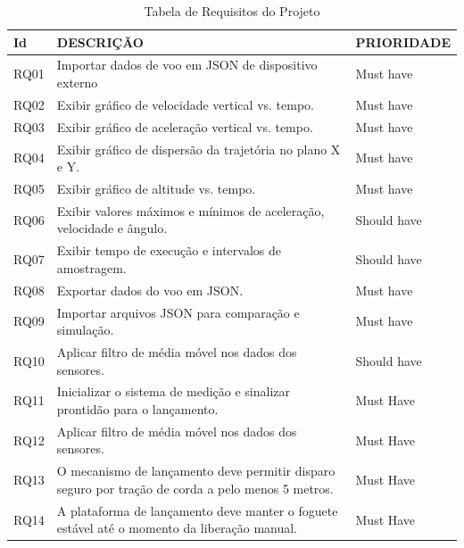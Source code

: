 \begin{samepage}
\begin{table}[H]
\centering
\scriptsize
\setlength{\tabcolsep}{4pt}
\caption{Tabela de Requisitos do Projeto}
\begin{tabular}{|l|p{8cm}|l|}
\hline
Id & DESCRIÇÃO & PRIORIDADE \\
\hline
RQ01 & Importar dados de voo em JSON de dispositivo externo & Must have \\
\hline
RQ02 & Exibir gráfico de velocidade vertical vs. tempo. & Must have \\
\hline
RQ03 & Exibir gráfico de aceleração vertical vs. tempo. & Must have \\
\hline
RQ04 & Exibir gráfico de dispersão da trajetória no plano X e Y. & Must have \\
\hline
RQ05 & Exibir gráfico de altitude vs. tempo. & Must have \\
\hline
RQ06 & Exibir valores máximos e mínimos de aceleração, velocidade e ângulo. & Should have \\
\hline
RQ07 & Exibir tempo de execução e intervalos de amostragem. & Should have \\
\hline
RQ08 & Exportar dados do voo em JSON. & Must have \\
\hline
RQ09 & Importar arquivos JSON para comparação e simulação. & Must have \\
\hline
RQ10 & Aplicar filtro de média móvel nos dados dos sensores. & Should have \\
\hline
RQ11 & Inicializar o sistema de medição e sinalizar prontidão para o lançamento. & Must Have \\
\hline
RQ12 & Aplicar filtro de média móvel nos dados dos sensores. & Must Have \\
\hline
RQ13 & O mecanismo de lançamento deve permitir disparo seguro por tração de corda a pelo menos 5 metros. & Must Have \\
\hline
RQ14 & A plataforma de lançamento deve manter o foguete estável até o momento da liberação manual. & Must Have \\
\hline
\end{tabular}
\label{tab:requisitos_projeto}
\end{table}

\end{samepage}




